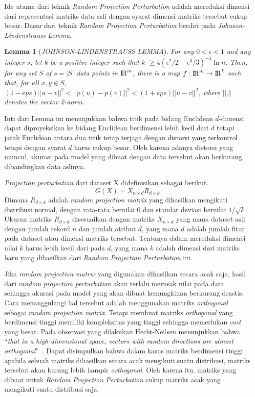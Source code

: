 Ide utama dari teknik \textit{Random Projection Perturbation} adalah mereduksi dimensi dari representasi matriks data asli dengan syarat dimensi matriks tersebut cukup besar. Dasar dari teknik \textit{Random Projection Perturbation} berdiri pada \textit{Johnson-Lindenstrauss Lemma}.~\cite{lindestrauss:84:jllemma}
\newtheorem{theorem}{Lemma}
\begin{theorem}[\textit{JOHNSON-LINDENSTRAUSS LEMMA}]
	For any \(0 < \epsilon < 1\) and any integer \(s\), let \(k\) be a positive integer such that \(k\) \(\geq 4(\epsilon^{2}/2-\epsilon^{3}/3)^{-1}\ln{n}\). Then, for any set \(S\) of \(s = |S|\) data points in \({\rm I\!R}^{m}\), there is a map \(f : {\rm I\!R}^{m} \rightarrow {\rm I\!R}^{k}\) such that, for all \(x, y \in S\), \((1-eps)||u - v||^{2}<||p(u) - p(v)||^{2}<(1+eps)||u - v||^{2}\), where \(||.||\) denotes the vector 2-norm.
\end{theorem}
Inti dari Lemma ini menunjukkan bahwa titik pada bidang Euclidean \(d\)-dimensi dapat diproyeksikan ke bidang Euclidean berdimensi lebih kecil dari \(d\) tetapi jarak Euclidean antara dua titik tetap terjaga dengan distorsi yang terkontrol tetapi dengan syarat \(d\) harus cukup besar. Oleh karena adanya distorsi yang muncul, akurasi pada model yang dibuat dengan data tersebut akan berkurang dibandingkan data aslinya.~\cite{kargupta:06:projection}

\textit{Projection perturbation} dari dataset X didefinisikan sebagai berikut.
\begin{equation}
	G(X) = X_{n \times d} R_{d \times k}
\end{equation}
Dimana \(R_{d \times k}\) adalah \textit{random projection matrix} yang dihasilkan mengikuti distribusi normal, dengan rata-rata bernilai 0 dan standar deviasi bernilai \(1/\sqrt{k}\). Ukuran matriks \(R_{d \times k}\) disesuaikan dengan matriks \(X_{n \times d}\) yang mana dataset asli dengan jumlah rekord \(n\) dan jumlah atribut \(d\), yang mana \(d\) adalah jumlah fitur pada dataset atau dimensi matriks tersebut. Tentunya dalam mereduksi dimensi nilai \(k\) harus lebih kecil dari pada \(d\), yang mana \(k\) adalah dimensi dari matriks baru yang dihasilkan dari \textit{Random Projection Perturbation} ini.

Jika \textit{random projection matrix} yang digunakan dihasilkan secara acak saja, hasil dari \textit{random projection perturbation} akan terlalu merusak nilai pada data sehingga akurasi pada model yang akan dibuat kemungkinan berkurang drastis. Cara menanggulangi hal tersebut adalah menggunakan matriks \textit{orthogonal} sebagai \textit{random projection matrix}. Tetapi membuat matriks \textit{orthogonal} yang berdimensi tinggi memiliki kompleksitas yang tinggi sehingga memerlukan \textit{cost} yang besar. Pada observasi yang dilakukan Hecht-Neilsen menunjukkan bahwa “\textit{that in a high-dimensional space, vectors with random directions are almost orthogonal}”~\cite{bingham:01:projection}. Dapat disimpulkan bahwa dalam kasus matriks berdimensi tinggi apabila sebuah matriks dihasilkan secara acak mengikuti suatu distribusi, matriks tersebut akan kurang lebih hampir \textit{orthogonal}. Oleh karena itu, matriks yang dibuat untuk \textit{Random Projection Perturbation} cukup matriks acak yang mengikuti suatu distribusi saja.

